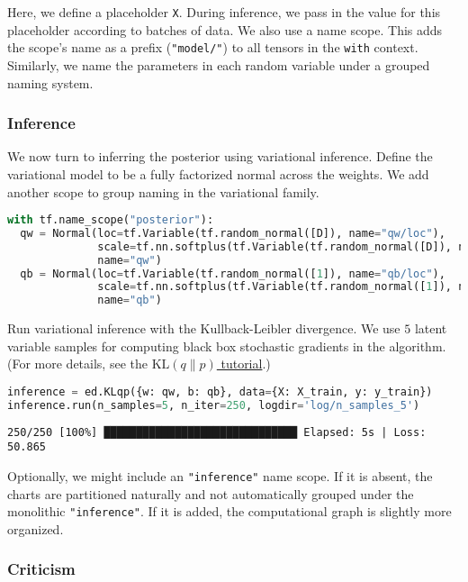Here, we define a placeholder \texttt{X}. During inference, we pass in
the value for this placeholder according to batches of data.  We also
use a name scope. This adds the scope's name as a prefix
(\texttt{"model/"}) to all tensors in the \texttt{with} context.
Similarly, we name the parameters in each random variable under a
grouped naming system.

\subsubsection{Inference}

We now turn to inferring the posterior using variational inference.
Define the variational model to be a fully factorized normal across
the weights. We add another scope to group naming in the variational
family.

\begin{lstlisting}[language=Python]
with tf.name_scope("posterior"):
  qw = Normal(loc=tf.Variable(tf.random_normal([D]), name="qw/loc"),
              scale=tf.nn.softplus(tf.Variable(tf.random_normal([D]), name="qw/unconstrained_scale")),
              name="qw")
  qb = Normal(loc=tf.Variable(tf.random_normal([1]), name="qb/loc"),
              scale=tf.nn.softplus(tf.Variable(tf.random_normal([1]), name="qb/unconstrained_scale")),
              name="qb")
\end{lstlisting}

Run variational inference with the Kullback-Leibler divergence.
We use $5$ latent variable samples for computing
black box stochastic gradients in the algorithm.
(For more details, see the
\href{/tutorials/klqp}{$\text{KL}(q\|p)$ tutorial}.)

\begin{lstlisting}[language=Python]
inference = ed.KLqp({w: qw, b: qb}, data={X: X_train, y: y_train})
inference.run(n_samples=5, n_iter=250, logdir='log/n_samples_5')
\end{lstlisting}

\begin{lstlisting}
250/250 [100%] ██████████████████████████████ Elapsed: 5s | Loss: 50.865
\end{lstlisting}

Optionally, we might include an \texttt{"inference"} name scope.
If it is absent, the charts are partitioned naturally
and not automatically grouped under the monolithic \texttt{"inference"}.
If it is added, the computational graph is slightly more organized.

\subsubsection{Criticism}

